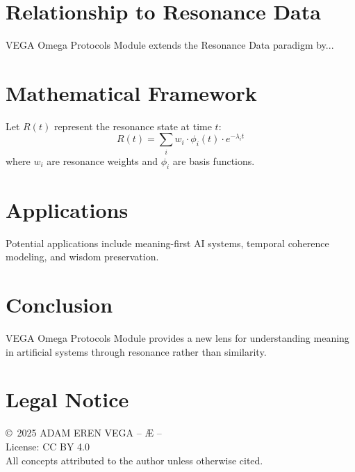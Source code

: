 \documentclass[12pt,a4paper]{article}
\begin{document}
\section{Relationship to Resonance Data}
VEGA Omega Protocols Module extends the Resonance Data paradigm by...

\section{Mathematical Framework}
Let $R(t)$ represent the resonance state at time $t$:
\begin{equation}
R(t) = \sum_{i} w_i \cdot \phi_i(t) \cdot e^{-\lambda_i t}
\end{equation}
where $w_i$ are resonance weights and $\phi_i$ are basis functions.

\section{Applications}
Potential applications include meaning-first AI systems,
temporal coherence modeling, and wisdom preservation.

\section{Conclusion}
VEGA Omega Protocols Module provides a new lens for understanding meaning
in artificial systems through resonance rather than similarity.

\section*{Legal Notice}
\copyright\ 2025 ADAM EREN VEGA – Æ –\\
License: CC BY 4.0\\
All concepts attributed to the author unless otherwise cited.
\end{document}

